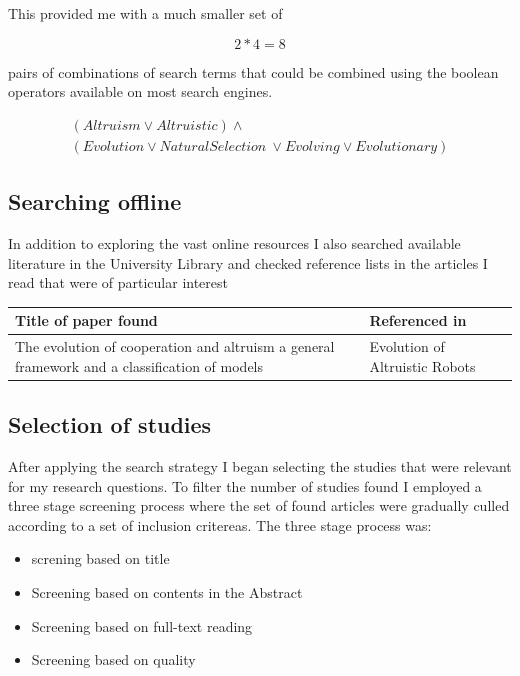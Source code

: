 \documentclass[a4paper]{book}
\begin{document}
This provided me with a much smaller set of 

\begin{equation}
\label{eq:comb}
2*4 = 8 
\end{equation}

\noindent
pairs of combinations of search terms that could be combined using the 
boolean operators available on most search engines.

\begin{multline}
\label{eq:search}
(Altruism \lor Altruistic ) \land \\
(Evolution \lor Natural Selection\ \lor Evolving \lor Evolutionary)
\end{multline}
 
\subsection{Searching offline}

In addition to exploring the vast online resources I also searched available literature in the University Library and checked reference lists 
in the articles I read that were of particular interest %

\begin{tabular}{| p{5cm} | p{5cm} |}
	\hline
	Title of paper found & Referenced in \\ \hline
        The evolution of cooperation and altruism  a general framework and a classification of models & Evolution of Altruistic Robots \\ \hline
\end{tabular}

	
\subsection{Selection of studies}

After applying the search strategy I began selecting the studies that were relevant for my research questions. To filter the number of studies found I employed a three stage screening process where the set of found articles were gradually culled according to a set of inclusion critereas. The three stage process was:

\begin{itemize}

\item screning based on title
\item Screening based on contents in the Abstract
\item Screening based on full-text reading
\item Screening based on quality

\end{itemize}
\end{document}
